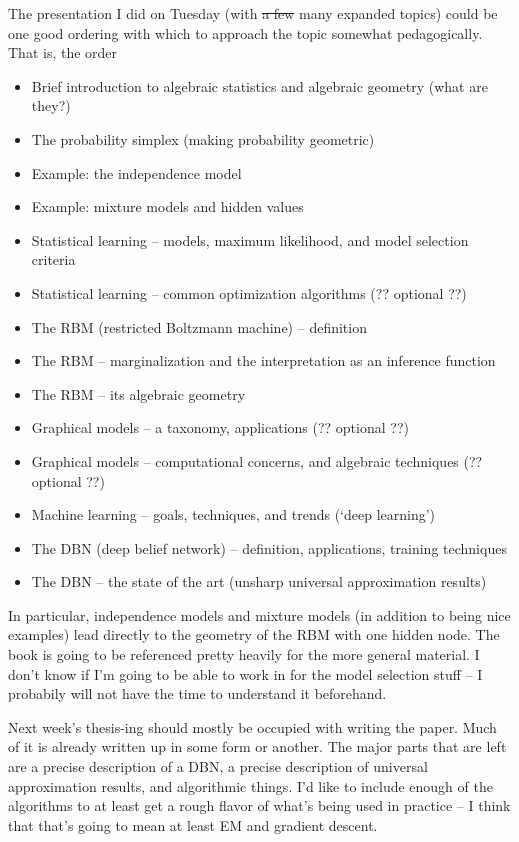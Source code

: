 \documentclass[12pt]{article}
\begin{document}
The presentation I did on Tuesday (with \sout{a few} many expanded topics) could
be one good ordering with which to approach the topic somewhat pedagogically.
That is, the order
\begin{itemize}
\item Brief introduction to algebraic statistics and algebraic geometry (what
are they?)
\item The probability simplex (making probability geometric)
\item Example: the independence model
\item Example: mixture models and hidden values
\item Statistical learning -- models, maximum likelihood, and model selection
criteria
\item Statistical learning -- common optimization algorithms (?? optional ??)
\item The RBM (restricted Boltzmann machine) -- definition
\item The RBM -- marginalization and the interpretation as an inference function
\item The RBM -- its algebraic geometry
\item Graphical models -- a taxonomy, applications (?? optional ??)
\item Graphical models -- computational concerns, and algebraic techniques (?? optional ??)
\item Machine learning -- goals, techniques, and trends (`deep learning')
\item The DBN (deep belief network) -- definition, applications, training techniques
\item The DBN -- the state of the art (unsharp universal approximation results)
\end{itemize}
In particular, independence models and mixture models (in addition to being nice
examples) lead directly to the geometry of the RBM with one hidden node.  The
book \cite{DSS09} is going to be referenced pretty heavily for the more
general material.  I don't know if I'm going to be able to work in
\cite{Wat09} for the model selection stuff -- I probabily will not have the
time to understand it beforehand.

Next week's thesis-ing should mostly be occupied with writing the paper.  Much
of it is already written up in some form or another.  The major parts that are
left are a precise description of a DBN, a precise description of universal
approximation results, and algorithmic things.  I'd like to include enough of
the algorithms to at least get a rough flavor of what's being used in practice
-- I think that that's going to mean at least EM and gradient descent.  
\end{document}
